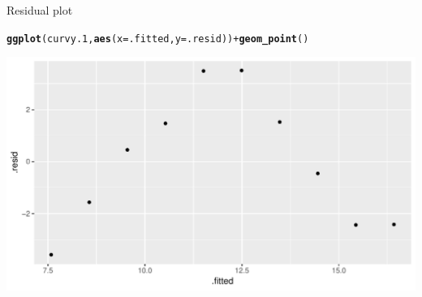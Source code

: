 \documentclass[unknownkeysallowed]{beamer}\usepackage[]{graphicx}\usepackage[]{color}
\makeatletter
\def\maxwidth{ %
  \ifdim\Gin@nat@width>\linewidth
    \linewidth
  \else
    \Gin@nat@width
  \fi
}
\newcommand{\hlopt}[1]{\textcolor[rgb]{0,0,0}{#1}}%
\newcommand{\hlstd}[1]{\textcolor[rgb]{0.345,0.345,0.345}{#1}}%
\newcommand{\hlkwc}[1]{\textcolor[rgb]{0.333,0.667,0.333}{#1}}%
\newcommand{\hlkwd}[1]{\textcolor[rgb]{0.737,0.353,0.396}{\textbf{#1}}}%
\newenvironment{kframe}{%
 \def\at@end@of@kframe{}%
 \ifinner\ifhmode%
  \def\at@end@of@kframe{\end{minipage}}%
  \begin{minipage}{\columnwidth}%
 \fi\fi%
 \def\FrameCommand##1{\hskip\@totalleftmargin \hskip-\fboxsep
 \colorbox{shadecolor}{##1}\hskip-\fboxsep
     \hskip-\linewidth \hskip-\@totalleftmargin \hskip\columnwidth}%
 \MakeFramed {\advance\hsize-\width
   \@totalleftmargin\z@ \linewidth\hsize
   \@setminipage}}%
 {\par\unskip\endMakeFramed%
 \at@end@of@kframe}
\newenvironment{knitrout}{}{} %
\makeatother
\begin{document}
\begin{frame}[fragile]{Residual plot}

 
\begin{knitrout}
\color{fgcolor}\begin{kframe}
\begin{alltt}
\hlkwd{ggplot}\hlstd{(curvy.1,}\hlkwd{aes}\hlstd{(}\hlkwc{x}\hlstd{=.fitted,}\hlkwc{y}\hlstd{=.resid))}\hlopt{+}\hlkwd{geom_point}\hlstd{()}
\end{alltt}
\end{kframe}
\includegraphics[width=\maxwidth]{figure/altoadige-1} 

\end{knitrout}
  
  

  
\end{frame}
\end{document}
